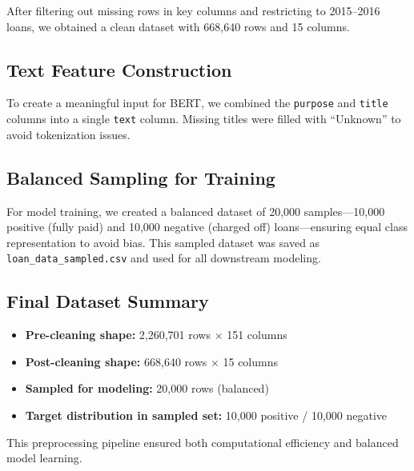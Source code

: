 After filtering out missing rows in key columns and restricting to 2015–2016 loans, we obtained a clean dataset with 668,640 rows and 15 columns.

\subsection{Text Feature Construction}

To create a meaningful input for BERT, we combined the \texttt{purpose} and \texttt{title} columns into a single \texttt{text} column. Missing titles were filled with “Unknown” to avoid tokenization issues.

\subsection{Balanced Sampling for Training}

For model training, we created a balanced dataset of 20,000 samples—10,000 positive (fully paid) and 10,000 negative (charged off) loans—ensuring equal class representation to avoid bias. This sampled dataset was saved as \texttt{loan\_data\_sampled.csv} and used for all downstream modeling.

\subsection{Final Dataset Summary}

\begin{itemize}
    \item \textbf{Pre-cleaning shape:} 2,260,701 rows × 151 columns
    \item \textbf{Post-cleaning shape:} 668,640 rows × 15 columns
    \item \textbf{Sampled for modeling:} 20,000 rows (balanced)
    \item \textbf{Target distribution in sampled set:} 10,000 positive / 10,000 negative
\end{itemize}

This preprocessing pipeline ensured both computational efficiency and balanced model learning.